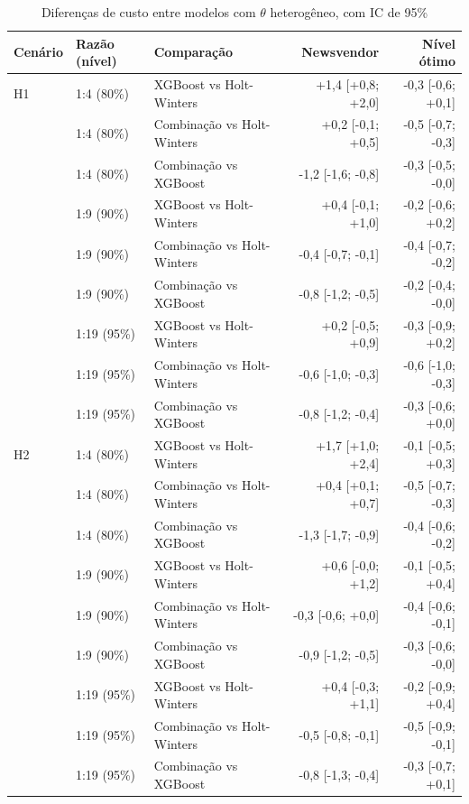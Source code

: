 \begin{table}[htbp]
\centering
\small
\caption{Diferenças de custo entre modelos com $\theta$ heterogêneo, com IC de 95\%}
\label{tab:het_diferencas}
\begin{tabular}{lllrr}
\toprule
Cenário & Razão (nível) & Comparação & Newsvendor & Nível ótimo \\
\midrule
H1 & 1:4 (80\%) & XGBoost vs Holt-Winters & +1,4 [+0,8; +2,0] & -0,3 [-0,6; +0,1] \\
 & 1:4 (80\%) & Combinação vs Holt-Winters & +0,2 [-0,1; +0,5] & -0,5 [-0,7; -0,3] \\
 & 1:4 (80\%) & Combinação vs XGBoost & -1,2 [-1,6; -0,8] & -0,3 [-0,5; -0,0] \\
 & 1:9 (90\%) & XGBoost vs Holt-Winters & +0,4 [-0,1; +1,0] & -0,2 [-0,6; +0,2] \\
 & 1:9 (90\%) & Combinação vs Holt-Winters & -0,4 [-0,7; -0,1] & -0,4 [-0,7; -0,2] \\
 & 1:9 (90\%) & Combinação vs XGBoost & -0,8 [-1,2; -0,5] & -0,2 [-0,4; -0,0] \\
 & 1:19 (95\%) & XGBoost vs Holt-Winters & +0,2 [-0,5; +0,9] & -0,3 [-0,9; +0,2] \\
 & 1:19 (95\%) & Combinação vs Holt-Winters & -0,6 [-1,0; -0,3] & -0,6 [-1,0; -0,3] \\
 & 1:19 (95\%) & Combinação vs XGBoost & -0,8 [-1,2; -0,4] & -0,3 [-0,6; +0,0] \\
\addlinespace
H2 & 1:4 (80\%) & XGBoost vs Holt-Winters & +1,7 [+1,0; +2,4] & -0,1 [-0,5; +0,3] \\
 & 1:4 (80\%) & Combinação vs Holt-Winters & +0,4 [+0,1; +0,7] & -0,5 [-0,7; -0,3] \\
 & 1:4 (80\%) & Combinação vs XGBoost & -1,3 [-1,7; -0,9] & -0,4 [-0,6; -0,2] \\
 & 1:9 (90\%) & XGBoost vs Holt-Winters & +0,6 [-0,0; +1,2] & -0,1 [-0,5; +0,4] \\
 & 1:9 (90\%) & Combinação vs Holt-Winters & -0,3 [-0,6; +0,0] & -0,4 [-0,6; -0,1] \\
 & 1:9 (90\%) & Combinação vs XGBoost & -0,9 [-1,2; -0,5] & -0,3 [-0,6; -0,0] \\
 & 1:19 (95\%) & XGBoost vs Holt-Winters & +0,4 [-0,3; +1,1] & -0,2 [-0,9; +0,4] \\
 & 1:19 (95\%) & Combinação vs Holt-Winters & -0,5 [-0,8; -0,1] & -0,5 [-0,9; -0,1] \\
 & 1:19 (95\%) & Combinação vs XGBoost & -0,8 [-1,3; -0,4] & -0,3 [-0,7; +0,1] \\

\end{tabular}
\end{table}
